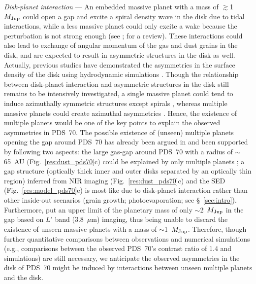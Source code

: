 \documentclass[apj]{emulateapj-rtx4}
\begin{document}
  {\it Disk-planet interaction} --- An embedded 
  massive planet with a mass of $\gtrsim$1~$M_{\rm Jup}$ could open a gap and excite a spiral density wave in the disk due to tidal 
  interactions, while a less massive planet could only excite a wake 
  because the perturbation is not strong enough (see \citealt{papa07}; \citealt{kley12} for a review). 
  These interactions could also 
  lead to exchange of angular momentum of the gas and dust grains 
  in the disk, and are expected to result in asymmetric structures in the disk as well. Actually, previous studies have demonstrated 
  the asymmetries in the surface density of the disk using hydrodynamic simulations \citep{dods11,isel13}.
  Though the relationship between disk-planet interaction and asymmetric structures in the disk still remains to be intensively 
  investigated, a single massive planet could tend to induce azimuthally symmetric structures except spirals \citep{kley12},
  whereas multiple massive planets could create azimuthal asymmetries \citep{dods11,isel13}.
  Hence, the existence of multiple planets would be one of the key points to explain the observed asymmetries in PDS~70.
  The possible existence of (unseen) multiple planets opening the gap around PDS~70 has already been argued in \citet{hash12,dong12b}
  and been supported by following two aspects: the large gas-gap
  around PDS~70 with a radius of $\sim$65~AU (Fig.~\ref{res:dust_pds70}c) 
  could be explained by only multiple planets \citep{zhu11,dods11}; a gap structure (optically thick inner and outer disks separated 
  by an optically thin region) inferred from NIR imaging (Fig.~\ref{res:dust_pds70}c) and the SED 
  (Fig.~\ref{res:model_pds70}e) is most like due to disk-planet interaction rather than other inside-out scenarios (grain growth; 
  photoevaporation; see \S~\ref{sec:intro}). Furthermore, \citet{hash12} put an upper limit of the planetary mass of only 
  $\sim$2~$M_{\rm Jup}$ in the gap based on $L'$ band (3.8~$\mu$m) imaging, 
thus being unable to discard the existence
  of unseen massive planets with a mass of $\sim$1~$M_{\rm Jup}$. 
  Therefore, though further quantitative comparisons between observations and numerical simulations (e.g., comparisons 
  between the observed PDS~70's contrast ratio of 1.4 and simulations) are still necessary, we anticipate the observed asymmetries 
  in the disk of PDS~70 might be induced by interactions between unseen multiple planets and the disk.
\end{document}
